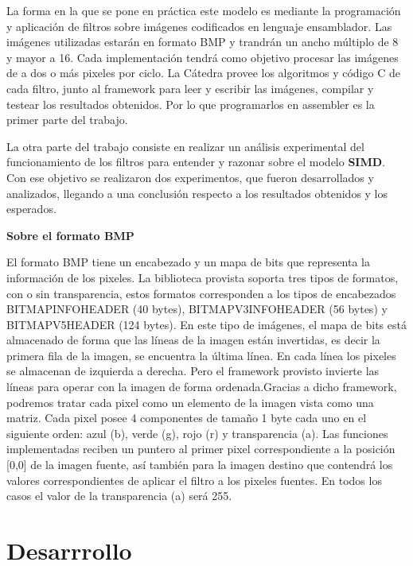 \documentclass[a4paper]{article}
\begin{document}
\bigskip

La forma en la que se pone en práctica este modelo es mediante la programación y aplicación de filtros sobre imágenes codificados en lenguaje ensamblador.
Las imágenes utilizadas estarán en formato BMP y trandrán un ancho múltiplo de 8 y mayor a 16.
Cada implementación tendrá como objetivo procesar las imágenes de a dos o más pixeles por ciclo.
La Cátedra provee los algoritmos y código C de cada filtro, junto al framework para leer y escribir las imágenes, compilar y testear los resultados obtenidos. Por lo que programarlos en assembler es la primer parte del trabajo.

\bigskip

La otra parte del trabajo consiste en realizar un análisis experimental del funcionamiento de los filtros para entender y razonar sobre el modelo \textbf{SIMD}. Con ese objetivo se realizaron dos experimentos, que fueron desarrollados y analizados, llegando a una conclusión respecto a los resultados obtenidos y los esperados.


\bigskip

{\centering\textbf{\large{Sobre el formato BMP}}} 

\medskip

El formato BMP tiene un encabezado y un mapa de bits que representa la información de los pixeles. La biblioteca provista soporta tres tipos de formatos, con o sin transparencia, estos formatos corresponden a los tipos de encabezados BITMAPINFOHEADER (40 bytes), BITMAPV3INFOHEADER (56 bytes) y BITMAPV5HEADER (124 bytes).
En este tipo de imágenes, el mapa de bits está almacenado de forma que las líneas de la imagen están invertidas, es decir la primera fila de la imagen, se encuentra la última línea. En cada línea los pixeles se almacenan de izquierda a derecha. Pero el framework provisto invierte las líneas para operar con la imagen de forma ordenada.Gracias a dicho framework, podremos tratar cada pixel como un elemento de la imagen vista como una matriz.
Cada pixel posee 4 componentes de tamaño 1 byte cada uno en el siguiente orden: azul (b), verde (g), rojo (r) y transparencia (a).
Las funciones implementadas reciben un puntero al primer pixel correspondiente a la posición [0,0] de la imagen fuente, así también para la imagen destino que contendrá los valores  correspondientes de aplicar el filtro a los pixeles fuentes.
En todos los casos el valor de la transparencia (a) será 255.

\section{Desarrrollo}
\end{document}
